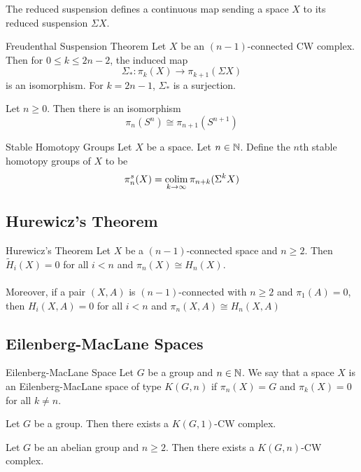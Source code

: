 \documentclass[a4paper]{article}
\begin{document}
The reduced suspension defines a continuous map sending a space $X$ to its reduced suspension $\Sigma X$. 

\begin{thm}{Freudenthal Suspension Theorem}{} Let $X$ be an $(n-1)$-connected CW complex. Then for $0\leq k\leq 2n-2$, the induced map $$\Sigma_\ast:\pi_k(X)\to\pi_{k+1}(\Sigma X)$$ is an isomorphism. For $k=2n-1$, $\Sigma_\ast$ is a surjection. 
\end{thm}

\begin{crl}{}{} Let $n\geq 0$. Then there is an isomorphism $$\pi_n(S^n)\cong\pi_{n+1}(S^{n+1})$$
\end{crl}

\begin{defn}{Stable Homotopy Groups}{} Let $X$ be a space. Let $n\in\mathbb{N}$. Define the $n$th stable homotopy groups of $X$ to be $$\pi_n^s(X)=\operatorname*{colim}_{k\to\infty}\pi_{n+k}(\Sigma^kX)$$
\end{defn}

\subsection{Hurewicz's Theorem}
\begin{thm}{Hurewicz's Theorem}{} Let $X$ be a $(n-1)$-connected space and $n\geq 2$. Then $\widetilde{H}_i(X)=0$ for all $i<n$ and $\pi_n(X)\cong H_n(X)$. \\~\\

Moreover, if a pair $(X,A)$ is $(n-1)$-connected with $n\geq 2$ and $\pi_1(A)=0$, then $H_i(X,A)=0$ for all $i<n$ and $\pi_n(X,A)\cong H_n(X,A)$
\end{thm}

\subsection{Eilenberg-MacLane Spaces}
\begin{defn}{Eilenberg-MacLane Space}{} Let $G$ be a group and $n\in\mathbb{N}$. We say that a space $X$ is an Eilenberg-MacLane space of type $K(G,n)$ if $\pi_n(X)=G$ and $\pi_k(X)=0$ for all $k\neq n$. 
\end{defn}

\begin{prp}{}{} Let $G$ be a group. Then there exists a $K(G,1)$-CW complex. 
\end{prp}

\begin{thm}{}{} Let $G$ be an abelian group and $n\geq 2$. Then there exists a $K(G,n)$-CW complex. 
\end{thm}
\end{document}
